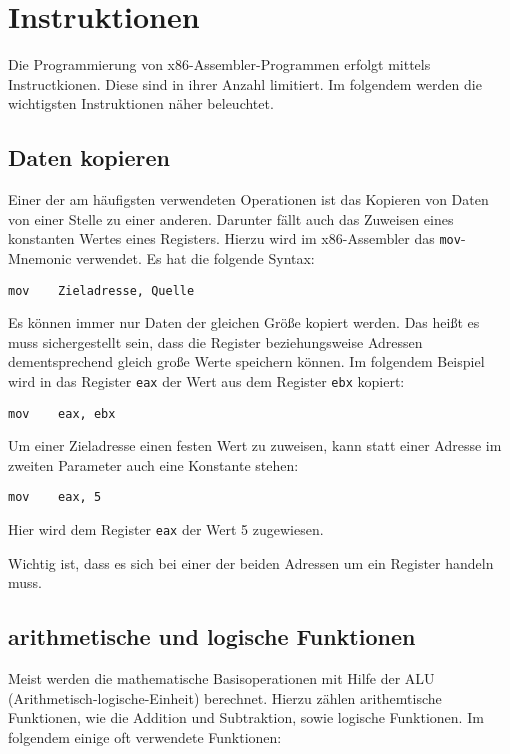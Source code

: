 \section{Instruktionen}

Die Programmierung von x86-Assembler-Programmen erfolgt mittels Instructkionen. Diese sind in ihrer Anzahl limitiert. Im folgendem werden die wichtigsten Instruktionen näher beleuchtet.

\subsection{Daten kopieren}
Einer der am häufigsten verwendeten Operationen ist das Kopieren von Daten von einer Stelle zu einer anderen.
Darunter fällt auch das Zuweisen eines konstanten Wertes eines Registers.
Hierzu wird im x86-Assembler das \texttt{mov}-Mnemonic verwendet. Es hat die folgende Syntax:

\begin{verbatim}mov    Zieladresse, Quelle\end{verbatim}

Es können immer nur Daten der gleichen Größe kopiert werden.
Das heißt es muss sichergestellt sein, dass die Register beziehungsweise Adressen dementsprechend gleich große Werte speichern können.
Im folgendem Beispiel wird in das Register \texttt{eax} der Wert aus dem Register \texttt{ebx} kopiert:

\begin{verbatim}mov    eax, ebx\end{verbatim}

Um einer Zieladresse einen festen Wert zu zuweisen, kann statt einer Adresse im zweiten Parameter auch eine Konstante stehen:

\begin{verbatim}mov    eax, 5\end{verbatim}

Hier wird dem Register \texttt{eax} der Wert 5 zugewiesen.

Wichtig ist, dass es sich bei einer der beiden Adressen um ein Register handeln muss.


\subsection{arithmetische und logische Funktionen}
Meist werden die mathematische Basisoperationen mit Hilfe der ALU (Arithmetisch-logische-Einheit) berechnet.
Hierzu zählen arithemtische Funktionen, wie die Addition und Subtraktion, sowie logische Funktionen.
Im folgendem einige oft verwendete Funktionen:

